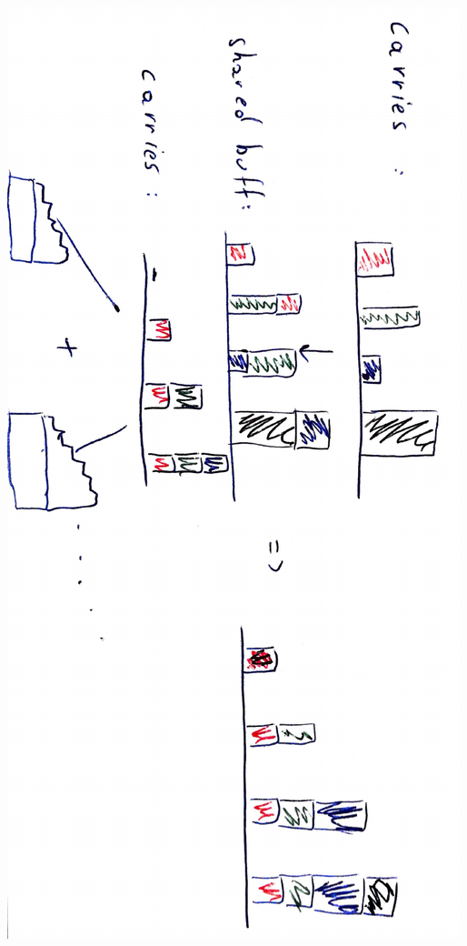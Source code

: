 \documentclass[11pt,a4paper]{article}
\begin{document}
\begin{minipage}[t]{0.27\textwidth}
	\includegraphics[width=\textwidth,angle=90]{Bilder/Ex5_1_4}
\end{minipage}
\end{document}
